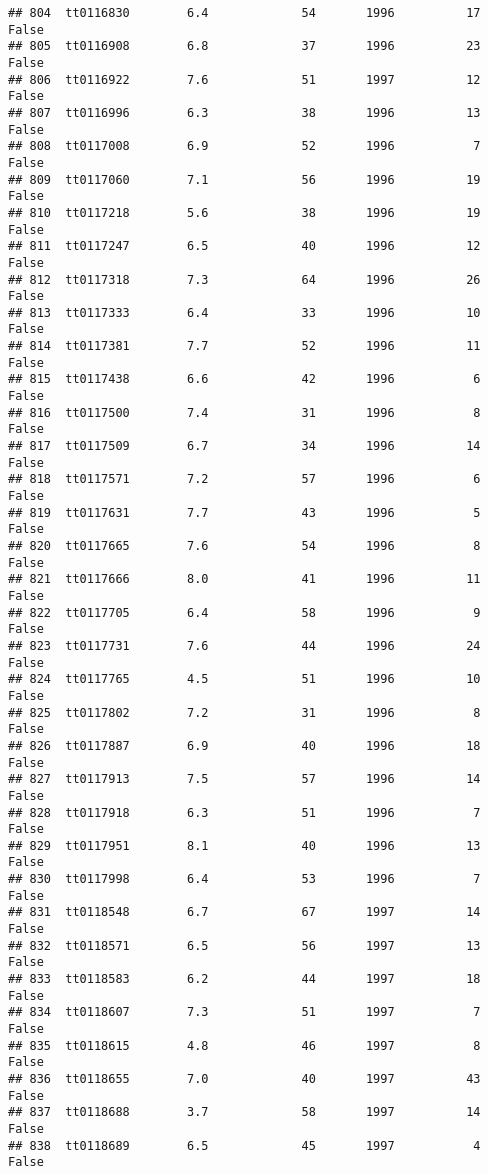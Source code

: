 \documentclass[
]{article}
\begin{document}
\begin{verbatim}
## 804  tt0116830        6.4             54       1996          17   False
## 805  tt0116908        6.8             37       1996          23   False
## 806  tt0116922        7.6             51       1997          12   False
## 807  tt0116996        6.3             38       1996          13   False
## 808  tt0117008        6.9             52       1996           7   False
## 809  tt0117060        7.1             56       1996          19   False
## 810  tt0117218        5.6             38       1996          19   False
## 811  tt0117247        6.5             40       1996          12   False
## 812  tt0117318        7.3             64       1996          26   False
## 813  tt0117333        6.4             33       1996          10   False
## 814  tt0117381        7.7             52       1996          11   False
## 815  tt0117438        6.6             42       1996           6   False
## 816  tt0117500        7.4             31       1996           8   False
## 817  tt0117509        6.7             34       1996          14   False
## 818  tt0117571        7.2             57       1996           6   False
## 819  tt0117631        7.7             43       1996           5   False
## 820  tt0117665        7.6             54       1996           8   False
## 821  tt0117666        8.0             41       1996          11   False
## 822  tt0117705        6.4             58       1996           9   False
## 823  tt0117731        7.6             44       1996          24   False
## 824  tt0117765        4.5             51       1996          10   False
## 825  tt0117802        7.2             31       1996           8   False
## 826  tt0117887        6.9             40       1996          18   False
## 827  tt0117913        7.5             57       1996          14   False
## 828  tt0117918        6.3             51       1996           7   False
## 829  tt0117951        8.1             40       1996          13   False
## 830  tt0117998        6.4             53       1996           7   False
## 831  tt0118548        6.7             67       1997          14   False
## 832  tt0118571        6.5             56       1997          13   False
## 833  tt0118583        6.2             44       1997          18   False
## 834  tt0118607        7.3             51       1997           7   False
## 835  tt0118615        4.8             46       1997           8   False
## 836  tt0118655        7.0             40       1997          43   False
## 837  tt0118688        3.7             58       1997          14   False
## 838  tt0118689        6.5             45       1997           4   False

\end{verbatim}
\end{document}
